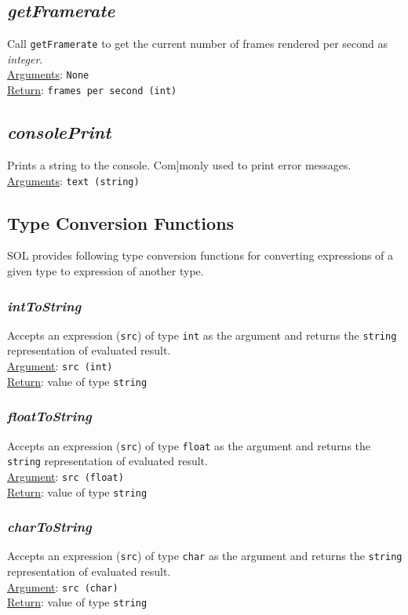 \documentclass[letterpaper,12pt]{article}
\begin{document}
    \subsection{\textit{getFramerate}}
    Call \texttt{getFramerate} to get the current number of frames rendered per second as \textit{integer}.\\
    \underline{Arguments}: \texttt{None}\\
    \underline{Return}: \texttt{frames per second (int)}

    \subsection{\textit{consolePrint}}
    Prints a string to the console. Com]monly used to print error messages.\\
    \underline{Arguments}: \texttt{text (string)}

    \subsection{Type Conversion Functions}
    SOL provides following type conversion functions for converting expressions of a given type to expression of another type.

        \subsubsection{\textit{intToString}}
        Accepts an expression (\texttt{src}) of type \texttt{int} as the argument and returns the \texttt{string} representation of evaluated result.\\
        \underline{Argument}: \texttt{src (int)}\\
        \underline{Return}: value of type \texttt{string}

        \subsubsection{\textit{floatToString}}
        Accepts an expression (\texttt{src}) of type \texttt{float} as the argument and returns the \texttt{string} representation of evaluated result.\\
        \underline{Argument}: \texttt{src (float)}\\
        \underline{Return}: value of type \texttt{string}

        \subsubsection{\textit{charToString}}
        Accepts an expression (\texttt{src}) of type \texttt{char} as the argument and returns the \texttt{string} representation of evaluated result.\\
        \underline{Argument}: \texttt{src (char)}\\
        \underline{Return}: value of type \texttt{string}
\end{document}
